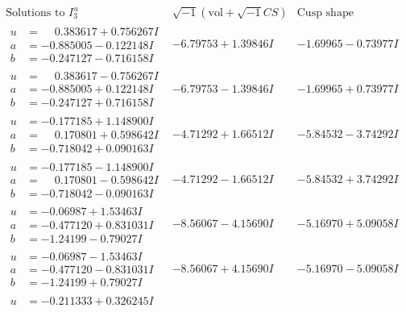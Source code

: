 \documentclass[1p]{elsarticle_modified}
\theoremstyle{definition}
\newcommand{\I}{\sqrt{-1}}
\begin{document}
$$\begin{array}{c|c|c}  
\text{Solutions to }I^u_{3}& \I (\text{vol} + \sqrt{-1}CS) & \text{Cusp shape}\\
 \hline 
\begin{aligned}
u &= \phantom{-}0.383617 + 0.756267 I \\
a &= -0.885005 - 0.122148 I \\
b &= -0.247127 - 0.716158 I\end{aligned}
 & -6.79753 + 1.39846 I & -1.69965 - 0.73977 I \\ \hline\begin{aligned}
u &= \phantom{-}0.383617 - 0.756267 I \\
a &= -0.885005 + 0.122148 I \\
b &= -0.247127 + 0.716158 I\end{aligned}
 & -6.79753 - 1.39846 I & -1.69965 + 0.73977 I \\ \hline\begin{aligned}
u &= -0.177185 + 1.148900 I \\
a &= \phantom{-}0.170801 + 0.598642 I \\
b &= -0.718042 + 0.090163 I\end{aligned}
 & -4.71292 + 1.66512 I & -5.84532 - 3.74292 I \\ \hline\begin{aligned}
u &= -0.177185 - 1.148900 I \\
a &= \phantom{-}0.170801 - 0.598642 I \\
b &= -0.718042 - 0.090163 I\end{aligned}
 & -4.71292 - 1.66512 I & -5.84532 + 3.74292 I \\ \hline\begin{aligned}
u &= -0.06987 + 1.53463 I \\
a &= -0.477120 + 0.831031 I \\
b &= -1.24199 - 0.79027 I\end{aligned}
 & -8.56067 - 4.15690 I & -5.16970 + 5.09058 I \\ \hline\begin{aligned}
u &= -0.06987 - 1.53463 I \\
a &= -0.477120 - 0.831031 I \\
b &= -1.24199 + 0.79027 I\end{aligned}
 & -8.56067 + 4.15690 I & -5.16970 - 5.09058 I \\ \hline\begin{aligned}
u &= -0.211333 + 0.326245 I \\

\end{aligned}
\end{array}$$
\end{document}
